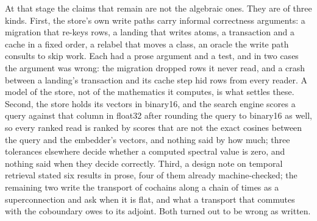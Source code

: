 \documentclass[11pt]{article}
\theoremstyle{plain}
\theoremstyle{definition}
\theoremstyle{remark}
\begin{document}
At that stage the claims that remain are not the algebraic ones. They are of three kinds. First,
the store's own write paths carry informal correctness arguments: a migration that re-keys rows,
a landing that writes atoms, a transaction and a cache in a fixed order, a relabel that moves a
class, an oracle the write path consults to skip work. Each had a prose argument and a test, and
in two cases the argument was wrong: the migration dropped rows it never read, and a crash between
a landing's transaction and its cache step hid rows from every reader. A model of the store, not
of the mathematics it computes, is what settles these. Second, the store holds its vectors in
binary16, and the search engine scores a query against that column in float32 after rounding the
query to binary16 as well, so every ranked read is ranked by scores that are not the exact cosines
between the query and the embedder's vectors, and nothing said by how much; three tolerances
elsewhere decide whether a computed spectral value is zero, and nothing said when they decide
correctly. Third, a design note on temporal retrieval stated six results in prose, four of them
already machine-checked; the remaining two write the transport of cochains along a chain of times
as a superconnection and ask when it is flat, and what a transport that commutes with the
coboundary owes to its adjoint. Both turned out to be wrong as written.
\end{document}
